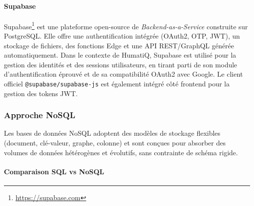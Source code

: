 \paragraph{Supabase}
Supabase\footnote{\url{https://supabase.com}} est une plateforme open-source de \textit{Backend-as-a-Service} construite sur PostgreSQL. Elle offre une authentification intégrée (OAuth2, OTP, JWT), un stockage de fichiers, des fonctions Edge et une API REST/GraphQL générée automatiquement.
Dans le contexte de HumatiQ, Supabase est utilisé pour la gestion des identités et des sessions utilisateurs, en tirant parti de son module d'authentification éprouvé et de sa compatibilité OAuth2 avec Google. Le client officiel \texttt{@supabase/supabase-js} est également intégré côté frontend pour la gestion des tokens JWT.
\subsubsection{Approche NoSQL}
Les bases de données NoSQL adoptent des modèles de stockage flexibles (document, clé-valeur, graphe, colonne) et sont conçues pour absorber des volumes de données hétérogènes et évolutifs, sans contrainte de schéma rigide.
\paragraph{Comparaison SQL vs NoSQL}
\begin{table}[H]
\centering
\renewcommand{\arraystretch}{1.4}
\caption{Comparaison SQL vs NoSQL pour HumatiQ}
\label{tab:sql_nosql}
\end{table}
